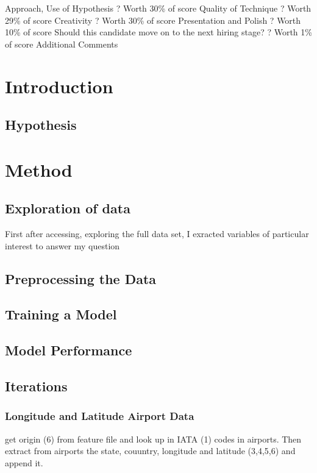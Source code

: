 \documentclass[a4paper, 11pt]{article}
\begin{document}
\clearpage

Approach, Use of Hypothesis ? Worth 30\% of score
Quality of Technique ? Worth 29\% of score
Creativity ? Worth 30\% of score
Presentation and Polish ? Worth 10\% of score
Should this candidate move on to the next hiring stage? ? Worth 1\% of score
Additional Comments
\clearpage

\section{Introduction}\label{intro}

\subsection{Hypothesis}\label{hypothesis}

\section{Method}

\subsection{Exploration of data}
First after accessing, exploring the full data set, I exracted variables of particular interest to answer my question

\subsection{Preprocessing the Data}
\subsection{Training a Model}
\subsection{Model Performance}
\subsection{Iterations}

\subsubsection{Longitude and Latitude Airport Data}
get origin (6) from feature file and look up in IATA (1) codes in airports. Then extract from airports the state, couuntry, longitude and latitude (3,4,5,6) and append it.
\end{document}
